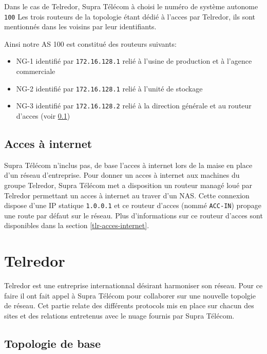 \documentclass{article}
\newcommand{\tlr}{Telredor\xspace}
\newcommand{\spr}{Supra Télécom\xspace}
\begin{document}
Dans le cas de \tlr, \spr à choisi le numéro de système autonome \texttt{100}
Les trois routeurs de la topologie étant dédié à l'acces par \tlr, ils sont mentionnés dans les voisins par leur identifiants.

Ainsi notre AS 100 est constitué des routeurs suivants:

\bigskip

\begin{itemize}
	\item NG-1 identifié par \texttt{172.16.128.1} relié à l'usine de production et à l'agence commerciale
	\item NG-2 identifié par \texttt{172.16.128.1} relié à l'unité de stockage
	\item NG-3 identifié par \texttt{172.16.128.2} relié à la direction générale et au routeur d'acces (voir \ref{acces-internet})
\end{itemize}

\bigskip

\subsection{Acces à internet}
\label{acces-internet}

\spr n'inclus pas, de base l'acces à internet lors de la maise en place d'un réseau d'entreprise.
Pour donner un acces à internet aux machines du groupe \tlr, \spr met a disposition un routeur managé loué par \tlr permettant un acces à internet au traver d'un NAS.
Cette connexion dispose d'une IP statique \texttt{1.0.0.1} et ce routeur d'acces (nommé \texttt{ACC-IN}) propage une route par défaut sur le réseau.
Plus d'informations sur ce routeur d'acces sont disponibles dans la section \ref{tlr-acces-internet}.

\section{\tlr}

\tlr est une entreprise internationnal désirant harmoniser son réseau.
Pour ce faire il ont fait appel à \spr pour collaborer sur une nouvelle topolgie de réseau.
Cet partie relate des différents protocols mis en place sur chacun des sites et des relations entretenus avec le nuage fournis par \spr.

\subsection{Topologie de base}
\end{document}

